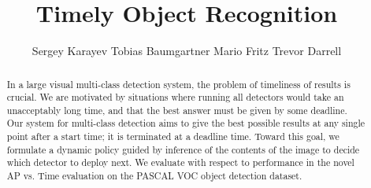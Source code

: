 \documentclass{article} %
\title{Timely Object Recognition}
\author{
Sergey Karayev \And
Tobias Baumgartner \And
Mario Fritz \And
Trevor Darrell
}
\begin{document}
\maketitle

\begin{abstract}
In a large visual multi-class detection system, the problem of timeliness of results is crucial.
We are motivated by situations where running all detectors would take an unacceptably long time, and that the best answer must be given by some deadline.
Our system for multi-class detection aims to give the best possible results at any single point after a start time; it is terminated at a deadline time.
Toward this goal, we formulate a dynamic policy guided by inference of the contents of the image to decide which detector to deploy next.
We evaluate with respect to performance in the novel AP vs. Time evaluation on the PASCAL VOC object detection dataset.
\end{abstract}






\renewcommand\bibsection{\subsubsection*{\refname}}

\small{
  
}
\end{document}
